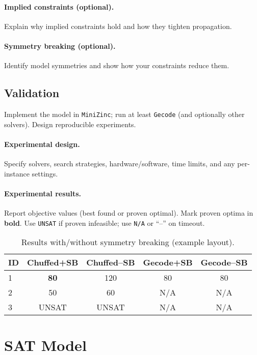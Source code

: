 \documentclass{article}
\begin{document}
\paragraph{Implied constraints (optional).}
Explain why implied constraints hold and how they tighten propagation.

\paragraph{Symmetry breaking (optional).}
Identify model symmetries and show how your constraints reduce them.

\subsection{Validation}
Implement the model in \texttt{MiniZinc}; run at least \texttt{Gecode}
(and optionally other solvers). Design reproducible experiments.

\paragraph{Experimental design.}
Specify solvers, search strategies, hardware/software, time limits, and any per-instance settings.

\paragraph{Experimental results.}
Report objective values (best found or proven optimal).
Mark proven optima in \textbf{bold}. Use \texttt{UNSAT} if proven infeasible; use \texttt{N/A} or ``--'' on timeout.

\begin{table}[h]
\centering
\caption{Results with/without symmetry breaking (example layout).}
\label{tab:cp}
\begin{tabular}{lcccc}
\toprule
\textbf{ID} & \textbf{Chuffed+SB} & \textbf{Chuffed--SB} & \textbf{Gecode+SB} & \textbf{Gecode--SB}\\
\midrule
1 & \textbf{80} & 120 & 80 & 80 \\
2 & 50 & 60 & N/A & N/A \\
3 & UNSAT & UNSAT & N/A & N/A \\
\bottomrule
\end{tabular}
\end{table}

\section{SAT Model}
\end{document}
